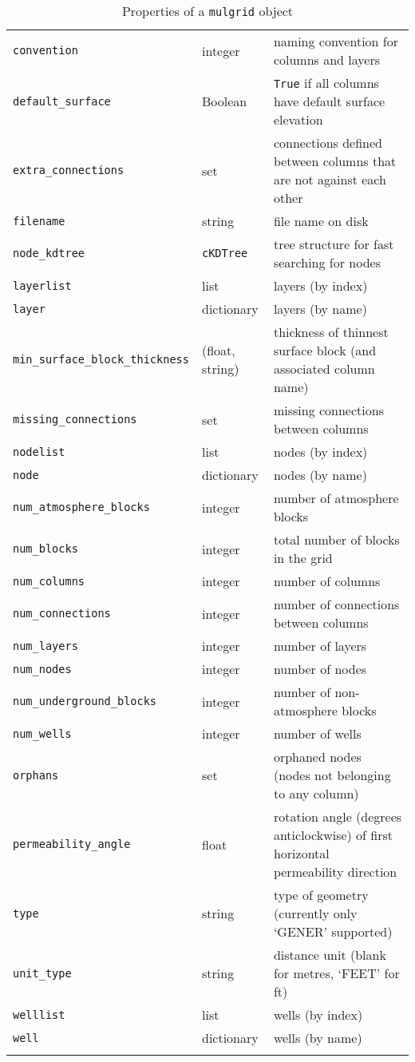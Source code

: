 \begin{center}
\begin{longtable}{|l|l|p{75mm}|}
    \texttt{convention} & integer & naming convention for columns and layers\\
    \texttt{default\_surface} & Boolean  & \texttt{True} if all columns have default surface elevation\\
    \texttt{extra\_connections} & set & connections defined between columns that are not against each other\\
    \texttt{filename} & string  & file name on disk\\
    \texttt{node\_kdtree} & \texttt{cKDTree} & tree structure for fast searching for nodes \\
    \texttt{layerlist} & list & layers (by index)\\
    \texttt{layer} & dictionary & layers (by name)\\
    \texttt{min\_surface\_block\_thickness} & (float, string) & thickness of thinnest surface block (and associated column name)\\
    \texttt{missing\_connections} & set & missing connections between columns\\
    \texttt{nodelist} & list  & nodes (by index)\\
    \texttt{node} & dictionary  & nodes (by name)\\
    \texttt{num\_atmosphere\_blocks} & integer & number of atmosphere blocks\\
    \texttt{num\_blocks} & integer & total number of blocks in the grid\\
    \texttt{num\_columns} & integer & number of columns\\
    \texttt{num\_connections} & integer & number of connections between columns\\
    \texttt{num\_layers} & integer & number of layers\\
    \texttt{num\_nodes} & integer & number of nodes\\
    \texttt{num\_underground\_blocks} & integer & number of non-atmosphere blocks\\
    \texttt{num\_wells} & integer & number of wells\\
    \texttt{orphans} & set & orphaned nodes (nodes not belonging to any column)\\
    \texttt{permeability\_angle} & float & rotation angle (degrees anticlockwise) of first horizontal permeability direction \\
    \texttt{type} & string  & type of geometry (currently only `GENER' supported)\\
    \texttt{unit\_type} & string & distance unit (blank for metres, `FEET' for ft)\\
    \texttt{welllist} & list & wells (by index)\\
    \texttt{well} & dictionary & wells (by name)\\
    \hline
    \caption{Properties of a \texttt{mulgrid} object}
    \label{tb:mulgrid_properties}
  \end{longtable}
\end{center}


